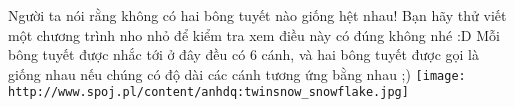 Người ta nói rằng không có hai bông tuyết nào giống hệt nhau! Bạn hãy thử viết một chương trình nho nhỏ để kiểm tra xem điều này có đúng không nhé :D Mỗi bông tuyết được nhắc tới ở đây đều có 6 cánh, và hai bông tuyết được gọi là giống nhau nếu chúng có độ dài các cánh tương ứng bằng nhau ;)  
\texttt{[image: http://www.spoj.pl/content/anhdq:twinsnow\_snowflake.jpg]}
